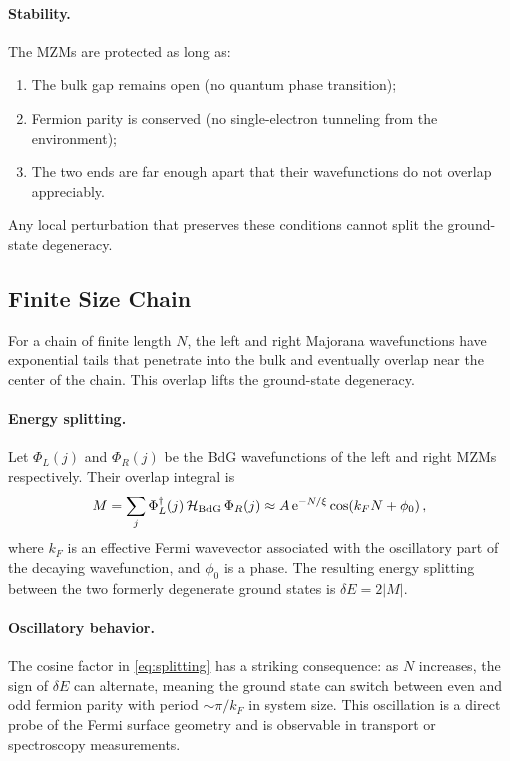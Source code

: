 \paragraph{Stability.}
The MZMs are protected as long as:
\begin{enumerate}[label=(\roman*)]
    \item The bulk gap remains open (no quantum phase transition);
    \item Fermion parity is conserved (no single-electron tunneling from the environment);
    \item The two ends are far enough apart that their wavefunctions do not overlap appreciably.
\end{enumerate}
Any local perturbation that preserves these conditions cannot split the ground-state degeneracy.

\subsection{Finite Size Chain}
\label{sec:finitesize}

For a chain of finite length $N$, the left and right Majorana wavefunctions have exponential tails that penetrate into the bulk and eventually overlap near the center of the chain. This overlap lifts the ground-state degeneracy.

\paragraph{Energy splitting.}
Let $\Phi_L(j)$ and $\Phi_R(j)$ be the BdG wavefunctions of the left and right MZMs respectively. Their overlap integral is
\begin{align}
    M = \sum_j \Phi_L^{\dag}(j)\,\mathcal{H}_{\rm BdG}\,\Phi_R(j) \approx A\,\mathrm{e}^{-N/\xi}\cos\!\left(k_F N + \phi_0\right),
    \label{eq:splitting}
\end{align}
where $k_F$ is an effective Fermi wavevector associated with the oscillatory part of the decaying wavefunction, and $\phi_0$ is a phase. The resulting energy splitting between the two formerly degenerate ground states is $\delta E = 2|M|$.

\paragraph{Oscillatory behavior.}
The cosine factor in \eqref{eq:splitting} has a striking consequence: as $N$ increases, the sign of $\delta E$ can alternate, meaning the ground state can switch between even and odd fermion parity with period $\sim \pi/k_F$ in system size. This oscillation is a direct probe of the Fermi surface geometry and is observable in transport or spectroscopy measurements.

